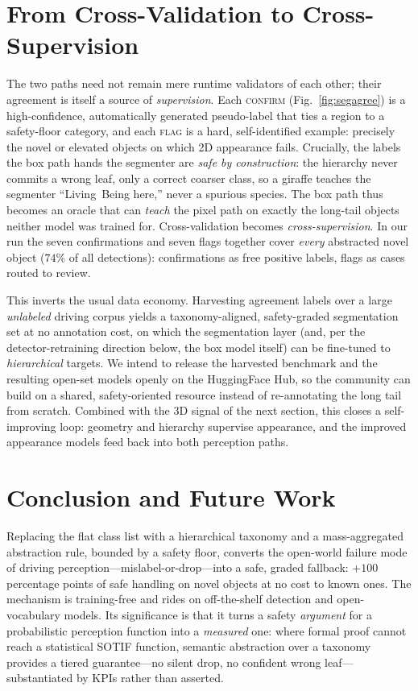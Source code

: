 \documentclass[conference]{IEEEtran}
\begin{document}
\section{From Cross-Validation to Cross-Supervision}
\label{sec:xsup}
The two paths need not remain mere runtime validators of each other; their
agreement is itself a source of \emph{supervision}. Each \textsc{confirm}
(Fig.~\ref{fig:segagree}) is a high-confidence, automatically generated
pseudo-label that ties a region to a safety-floor category, and each
\textsc{flag} is a hard, self-identified example: precisely the novel or
elevated objects on which 2D appearance fails. Crucially, the labels the box path
hands the segmenter are \emph{safe by construction}: the hierarchy never commits
a wrong leaf, only a correct coarser class, so a giraffe teaches the segmenter
``\textsf{Living~Being} here,'' never a spurious species. The box path thus
becomes an oracle that can \emph{teach} the pixel path on exactly the long-tail
objects neither model was trained for. Cross-validation becomes
\emph{cross-supervision}. In our run the seven confirmations and seven flags
together cover \emph{every} abstracted novel object ($74\%$ of all detections):
confirmations as free positive labels, flags as cases routed to review.

This inverts the usual data economy. Harvesting agreement labels over a large
\emph{unlabeled} driving corpus yields a taxonomy-aligned, safety-graded
segmentation set at no annotation cost, on which the segmentation layer (and, per
the detector-retraining direction below, the box model itself) can be fine-tuned
to \emph{hierarchical} targets. We intend to release the harvested benchmark and
the resulting open-set models openly on the HuggingFace Hub, so the community can
build on a shared, safety-oriented resource instead of re-annotating the long
tail from scratch. Combined with the 3D signal of the next section, this closes a
self-improving loop: geometry and hierarchy supervise appearance, and the
improved appearance models feed back into both perception paths.

\section{Conclusion and Future Work}
\label{sec:conclusion}

Replacing the flat class list with a hierarchical taxonomy and a mass-aggregated
abstraction rule, bounded by a safety floor, converts the open-world failure mode
of driving perception---mislabel-or-drop---into a safe, graded fallback:
$+100$ percentage points of safe handling on novel objects at no cost to known
ones. The mechanism is training-free and rides on off-the-shelf detection and
open-vocabulary models. Its significance is that it turns a safety
\emph{argument} for a probabilistic perception function into a \emph{measured}
one: where formal proof cannot reach a statistical SOTIF function, semantic
abstraction over a taxonomy provides a tiered guarantee---no silent drop, no
confident wrong leaf---substantiated by KPIs rather than asserted.
\end{document}
